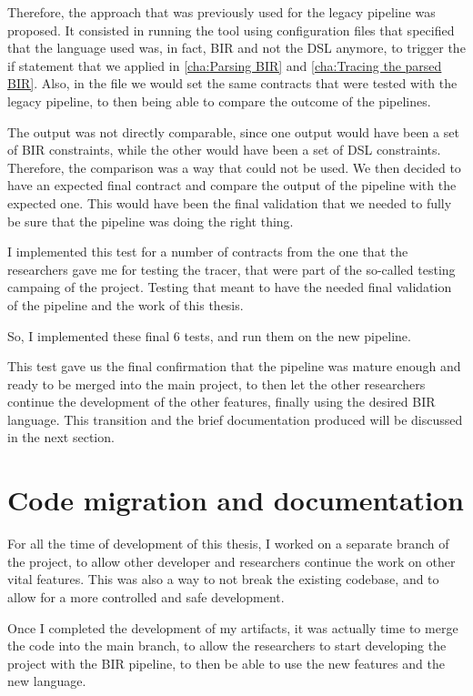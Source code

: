 Therefore, the approach that was previously used for the legacy pipeline was proposed.
It consisted in running the tool using configuration files that specified that
the language used was, in fact, BIR and not the DSL anymore, to trigger the if statement
that we applied in \ref{cha:Parsing BIR} and \ref{cha:Tracing the parsed BIR}.
Also, in the file we would set the same contracts that were tested with the legacy
pipeline, to then being able to compare the outcome of the pipelines.

The output was not directly comparable, since one output would have been a set of
BIR constraints, while the other would have been a set of DSL constraints. Therefore,
the comparison was a way that could not be used. We then decided to have an expected
final contract and compare the output of the pipeline with the expected one.
This would have been the final validation that we needed to fully be sure that
the pipeline was doing the right thing.

I implemented this test for a number of contracts from the one that the
researchers gave me for testing the tracer, that were part of the so-called testing
campaing of the project. Testing that meant to have the needed final validation
of the pipeline and the work of this thesis.

So, I implemented these final 6 tests, and run them on the new pipeline.

This test gave us the final confirmation that the pipeline was mature enough and
ready to be merged into the main project, to then let the other researchers continue
the development of the other features, finally using the desired BIR language. This
transition and the brief documentation produced will be discussed in the next section.

\section{Code migration and documentation}
\label{cha:Code migration and documentation} For all the time of development of this
thesis, I worked on a separate branch of the project, to allow other developer and
researchers continue the work on other vital features. This was also a way to
not break the existing codebase, and to allow for a more controlled and safe development.

Once I completed the development of my artifacts, it was actually time to merge
the code into the main branch, to allow the researchers to start developing the project
with the BIR pipeline, to then be able to use the new features and the new
language.

